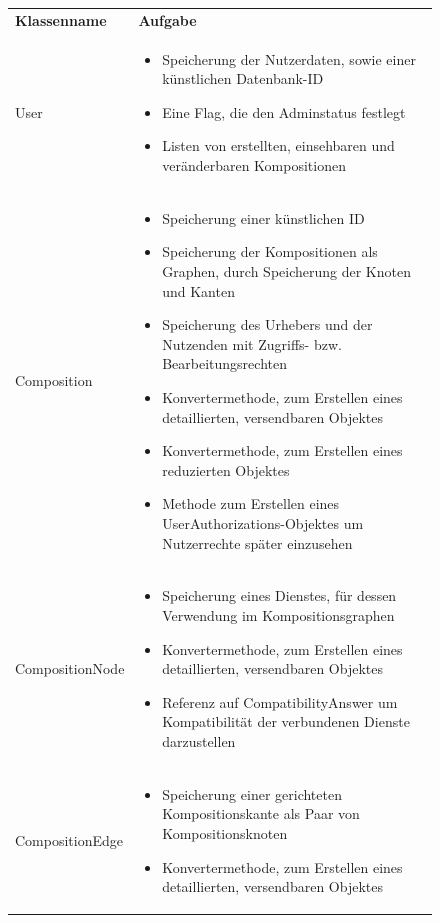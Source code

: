 \begin{figure}[h]
	\centering
	\begin{tabularx}{\textwidth}{p{} | X}
		\rowcolor[HTML]{C0C0C0}
		\textbf{Klassenname} & \textbf{Aufgabe} \\
		User & \compress \begin{itemize}
			\item Speicherung der Nutzerdaten, sowie einer künstlichen Datenbank-ID
			\item Eine Flag, die den Adminstatus festlegt
			\item Listen von erstellten, einsehbaren und veränderbaren Kompositionen
		\end{itemize}\\
		\rowcolor[HTML]{E7E7E7}
		Composition & \compress \begin{itemize}
		  \item Speicherung einer künstlichen ID
			\item Speicherung der Kompositionen als Graphen, durch Speicherung der Knoten und Kanten
			\item Speicherung des Urhebers und der Nutzenden mit Zugriffs- bzw. Bearbeitungsrechten
			\item Konvertermethode, zum Erstellen eines detaillierten, versendbaren Objektes
			\item Konvertermethode, zum Erstellen eines reduzierten Objektes
			\item Methode zum Erstellen eines UserAuthorizations-Objektes um Nutzerrechte später einzusehen
		\end{itemize} \\
		CompositionNode & \compress \begin{itemize}
			\item Speicherung eines Dienstes, für dessen Verwendung im Kompositionsgraphen
			\item Konvertermethode, zum Erstellen eines detaillierten, versendbaren Objektes
			\item Referenz auf CompatibilityAnswer um Kompatibilität der verbundenen Dienste darzustellen
		\end{itemize} \\
		\rowcolor[HTML]{E7E7E7}
		CompositionEdge & \compress \begin{itemize}
			\item Speicherung einer gerichteten Kompositionskante als Paar von Kompositionsknoten
			\item Konvertermethode, zum Erstellen eines detaillierten, versendbaren Objektes

\end{itemize}
\end{tabularx}
\end{figure}
